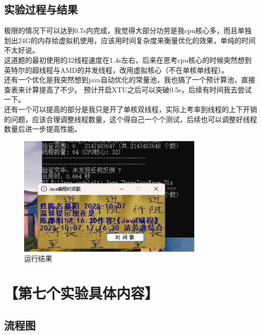 \documentclass[12pt,a4paper]{article}
\begin{document}
\subsection*{实验过程与结果}
    极限的情况下可以达到0.7s内完成，我觉得大部分功劳是我cpu核心多，而且单独划出24G的内存给虚拟机使用，应该用时间复杂度来衡量优化的效果，单纯的时间不太好说。\\
    
    这道题的最初使用的32线程速度在1.4s左右，后来在思考cpu核心的时候突然想到英特尔的超线程与AMD的并发线程，改用虚拟核心（不在单核单线程）。\\
    
    还有一个优化是我突然想到java自动优化的常量池，我也搞了一个预计算池，直接查表来计算提高了不少。
    预计开启XTU之后可以突破0.5s，后续有时间我去尝试一下。\\
    
    还有一个可以提高的部分是我只是开了单核双线程，实际上考率到线程的上下开销的问题，应该合理调整线程数量，这个得自己一个个测试，后续也可以调整好线程数量后进一步提高性能。\\

\begin{figure}[H]
\centering
\includegraphics[width=0.8\textwidth]{six.png}
\caption{运行结果}
\end{figure}

\section*{【第七个实验具体内容】}
\subsection*{流程图}
\end{document}
